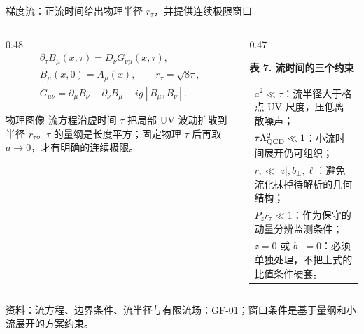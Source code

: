 \documentclass[UTF8,aspectratio=169,11pt]{ctexbeamer}
\newcommand{\source}[1]{%
  \par\vspace{-0.08em}%
  \noindent\parbox[t]{0.97\linewidth}{\raggedright\scriptsize\color{muted}资料：#1}\par}
\begin{document}
\begin{frame}[t]{梯度流：正流时间给出物理半径 $r_\tau$，并提供连续极限窗口}
  \begin{columns}[T,totalwidth=\textwidth]
    \begin{column}{0.48\textwidth}
      {\scriptsize
      \begin{gather*}
        \partial_\tau B_\mu(x,\tau)=D_\nu G_{\nu\mu}(x,\tau),\\[-0.15em]
        B_\mu(x,0)=A_\mu(x),\qquad r_\tau=\sqrt{8\tau},\\[-0.15em]
        G_{\mu\nu}=\partial_\mu B_\nu-\partial_\nu B_\mu
          +ig[B_\mu,B_\nu].
      \end{gather*}}
      \begin{block}{物理图像}
        流方程沿虚时间 $\tau$ 把局部 UV 波动扩散到半径 $r_\tau$。$\tau$ 的量纲是长度平方；固定物理 $\tau$ 后再取 $a\to0$，才有明确的连续极限。
      \end{block}
    \end{column}
    \begin{column}{0.47\textwidth}
      \begin{center}
      \textbf{表 7. 流时间的三个约束}
      \vspace{0.12em}
      {\scriptsize\begin{tabular}{@{}p{\linewidth}@{}}
        \toprule
        $a^2\ll\tau$：流半径大于格点 UV 尺度，压低离散噪声；\\
        $\tau\Lambda_{\rm QCD}^2\ll1$：小流时间展开仍可组织；\\
        $r_\tau\ll|z|,b_\perp,\ell$：避免流化抹掉待解析的几何结构；\\
        $P_z r_\tau\ll1$：作为保守的动量分辨监测条件；\\
        $z=0$ 或 $b_\perp=0$：必须单独处理，不把上式的比值条件硬套。\\
        \bottomrule
      \end{tabular}}
      \end{center}
    \end{column}
  \end{columns}
  \source{流方程、边界条件、流半径与有限流场：GF-01；窗口条件是基于量纲和小流展开的方案约束。}
\end{frame}
\end{document}
